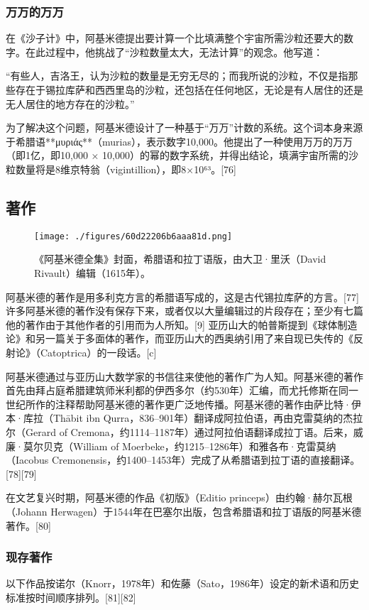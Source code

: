 \subsubsection{万万的万万}
在《沙子计》中，阿基米德提出要计算一个比填满整个宇宙所需沙粒还要大的数字。在此过程中，他挑战了“沙粒数量太大，无法计算”的观念。他写道：

“有些人，吉洛王，认为沙粒的数量是无穷无尽的；而我所说的沙粒，不仅是指那些存在于锡拉库萨和西西里岛的沙粒，还包括在任何地区，无论是有人居住的还是无人居住的地方存在的沙粒。”

为了解决这个问题，阿基米德设计了一种基于“万万”计数的系统。这个词本身来源于希腊语**μυριάς**（murias），表示数字10,000。他提出了一种使用万万的万万（即1亿，即10,000 × 10,000）的幂的数字系统，并得出结论，填满宇宙所需的沙粒数量将是8维京特翁（vigintillion），即8×10⁶³。[76]
\subsection{著作}
\begin{figure}[ht]
\centering
\texttt{[image: ./figures/60d22206b6aaa81d.png]}
\caption{《阿基米德全集》封面，希腊语和拉丁语版，由大卫·里沃（David Rivault）编辑（1615年）。} \label{fig_Archim_7}
\end{figure}
阿基米德的著作是用多利克方言的希腊语写成的，这是古代锡拉库萨的方言。[77] 许多阿基米德的著作没有保存下来，或者仅以大量编辑过的片段存在；至少有七篇他的著作由于其他作者的引用而为人所知。[9] 亚历山大的帕普斯提到《球体制造论》和另一篇关于多面体的著作，而亚历山大的西奥纳引用了来自现已失传的《反射论》（Catoptrica）的一段话。[c]

阿基米德通过与亚历山大数学家的书信往来使他的著作广为人知。阿基米德的著作首先由拜占庭希腊建筑师米利都的伊西多尔（约530年）汇编，而尤托修斯在同一世纪所作的注释帮助阿基米德的著作更广泛地传播。阿基米德的著作由萨比特·伊本·库拉（Thābit ibn Qurra，836–901年）翻译成阿拉伯语，再由克雷莫纳的杰拉尔（Gerard of Cremona，约1114–1187年）通过阿拉伯语翻译成拉丁语。后来，威廉·莫尔贝克（William of Moerbeke，约1215–1286年）和雅各布·克雷莫纳（Iacobus Cremonensis，约1400–1453年）完成了从希腊语到拉丁语的直接翻译。[78][79]

在文艺复兴时期，阿基米德的作品《初版》（Editio princeps）由约翰·赫尔瓦根（Johann Herwagen）于1544年在巴塞尔出版，包含希腊语和拉丁语版的阿基米德著作。[80]
\subsubsection{现存著作} 
以下作品按诺尔（Knorr，1978年）和佐藤（Sato，1986年）设定的新术语和历史标准按时间顺序排列。[81][82]